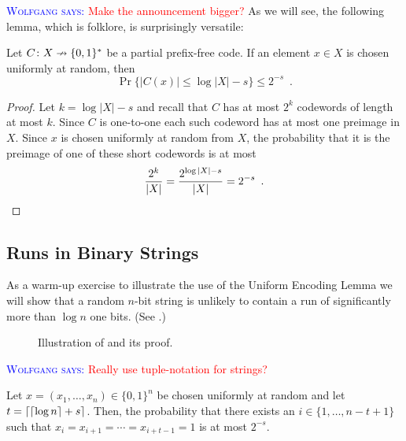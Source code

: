 \documentclass{patmorin}
\newcommand{\aremark}[3]{\textcolor{blue}{\textsc{#1 #2:}}
  \textcolor{red}{\textsf{#3}}}
\newcommand{\wolfgang}[2][says]{\aremark{Wolfgang}{#1}{#2}}
\begin{document}
\wolfgang{Make the announcement bigger?}
As we will see, the following lemma, which is folklore, is
surprisingly versatile:
\begin{lem}
  Let $C\colon X\nrightarrow \{0,1\}^*$ be a partial prefix-free
  code. If an element $x\in X$ is chosen uniformly at random, then
  \[
    \Pr\{|C(x)|\le \log|X|-s\}\le 2^{-s} \enspace .
  \]
\end{lem}

\begin{proof}
  Let $k=\log|X|-s$ and recall that $C$ has at most $2^{k}$ codewords
  of length at most $k$.  Since $C$ is one-to-one each such codeword
  has at most one preimage in $X$.  Since $x$ is chosen uniformly at
  random from $X$, the probability that it is the preimage of one of
  these short codewords is at most
  \[
  \frac{2^k}{|X|} = \frac{2^{\log|X|-s}}{|X|} = 2^{-s} \enspace
  . \qedhere
  \]
\end{proof}

\subsection{Runs in Binary Strings}

As a warm-up exercise to illustrate the use of the Uniform Encoding
Lemma we will show that a random $n$-bit string is unlikely to contain
a run of significantly more than $\log n$ one bits.  (See
.)

\begin{figure}
  \caption{Illustration of  and its proof.}
\end{figure}

\wolfgang{Really use tuple-notation for strings?}
\begin{thm}
  Let $x=(x_1,\ldots,x_n)\in\{0,1\}^n$ be chosen uniformly at random
  and let $t = {\lceil {\lceil \log n \rceil} + s \rceil}$. Then, the probability that
  there exists an $i\in\{1,\ldots,n-t+1\}$ such that
  $x_i=x_{i+1}=\cdots=x_{i+t-1}=1$ is at most $2^{-s}$.
\end{thm}
\end{document}
